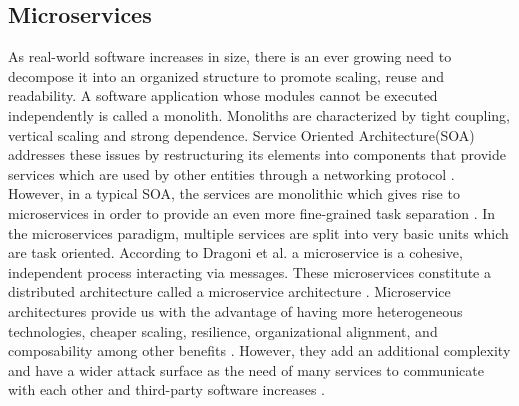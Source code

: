 \subsection{Microservices}
\label{chap:microservices}


As real-world software increases in size, there is an ever growing need to decompose it into an organized structure to promote scaling, reuse and readability. A software application whose modules cannot be executed independently is called a monolith. Monoliths are characterized by tight coupling, vertical scaling and strong dependence. Service Oriented Architecture(SOA) addresses these issues by restructuring its elements into components that provide services which are used by other entities through a networking protocol \cite{papazoglou2003service}. However, in a typical SOA, the services are monolithic which gives rise to microservices in order to provide an even more fine-grained task separation \cite{ahmadvand2016requirements}.
In the microservices paradigm, multiple services are split into very basic units which are task oriented. According to Dragoni et al. a microservice is a cohesive, independent process interacting via messages. These microservices constitute a distributed architecture called a microservice architecture \cite{dragoni2017microservices}. Microservice architectures provide us with the advantage of having more heterogeneous technologies, cheaper scaling, resilience, organizational alignment, and composability among other benefits \cite{newman2015building}. However, they add an additional complexity and have a wider attack surface as the need of many services to communicate with each other and third-party software increases \cite{combe2016docker, dragoni2017microservices}. 

